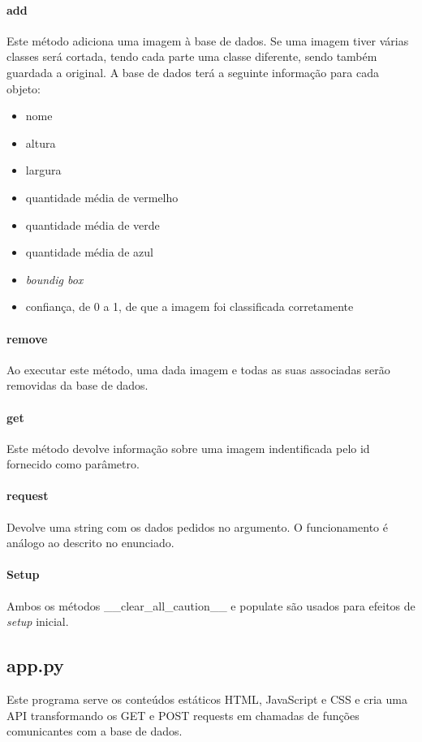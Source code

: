 \documentclass{report}
\begin{document}
\paragraph{add}
Este método adiciona uma imagem à base de dados. Se uma imagem tiver várias classes será cortada, 
tendo cada parte uma classe diferente, sendo também guardada a original. A base de dados terá a 
seguinte informação para cada objeto:
\begin{itemize}
\item nome
\item altura
\item largura
\item quantidade média de vermelho
\item quantidade média de verde
\item quantidade média de azul
\item \textit{boundig box}
\item confiança, de 0 a 1, de que a imagem foi classificada corretamente
\end{itemize}

\paragraph{remove}
Ao executar este método, uma dada imagem e todas as suas associadas serão removidas da base de dados.

\paragraph{get}
Este método devolve informação sobre uma imagem indentificada pelo id fornecido como parâmetro.

\paragraph{request}

Devolve uma string com os dados pedidos no argumento. O funcionamento é análogo ao descrito no enunciado.


\paragraph{Setup}
Ambos os métodos \_\_clear\_all\_caution\_\_ e  populate são usados para efeitos de \textit{setup} inicial.

\subsection{app.py}
Este programa serve os conteúdos estáticos \ac{HTML}, JavaScript e \ac{CSS} e cria uma API transformando os GET e POST requests em chamadas de funções comunicantes com a base de dados. 
\end{document}
